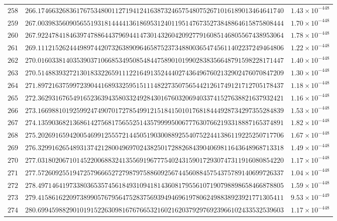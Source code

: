 \documentclass[12pt,reqno]{amsart}
\theoremstyle{remark}
\begin{document}
\begin{longtable}{clc}
$258$ & $266.1746632683617675348001127194124163873246575480752671016189013464641740$ & $1.43\times 10^{-448}$ \\
$259$ & $267.0039835609056551931814444136186953124011951476735273848864615875808444$ & $1.70\times 10^{-448}$ \\
$260$ & $267.9224784184639747886443796944147301432604209277916085146805567438953064$ & $1.78\times 10^{-448}$ \\
$261$ & $269.1112152624449897442073263890964658752373488003654745611402237249464806$ & $1.22\times 10^{-448}$ \\
$262$ & $270.0160338140353903710668534950854844758901019902838356648791598228171447$ & $1.40\times 10^{-448}$ \\
$263$ & $270.5148839327213018332265911122164913524440274364967602132902476070847209$ & $1.30\times 10^{-448}$ \\
$264$ & $271.8972163759972390441689332595151114822735075654421261749121712705178437$ & $1.18\times 10^{-448}$ \\
$265$ & $272.3629316765491652363943580332492843016760320694033741527638821637932421$ & $1.16\times 10^{-448}$ \\
$266$ & $273.1669881019259924749070172785499121518415010176818444928734297355284839$ & $1.53\times 10^{-448}$ \\
$267$ & $274.1359036821368614275681756552514357999950067776307662193318887165374891$ & $1.82\times 10^{-448}$ \\
$268$ & $275.2026916594200546991255572144505190300889255407522441386119225250717706$ & $1.67\times 10^{-448}$ \\
$269$ & $276.3299162654893137421280049697024382501728826843904069811643648968713318$ & $1.49\times 10^{-448}$ \\
$270$ & $277.0318020671014522006883241355691967775402431590172930747311916080854220$ & $1.17\times 10^{-448}$ \\
$271$ & $277.5726092551947257966652727987975886092567445608845754375789140699726337$ & $1.04\times 10^{-448}$ \\
$272$ & $278.4971464197338036535745618493109418143608179556107190798898658466878805$ & $1.59\times 10^{-448}$ \\
$273$ & $279.4158616220973899057679564752837569394946961978062498838923921771305411$ & $9.53\times 10^{-449}$ \\
$274$ & $280.6994598829010191522630981676766532160216203792976923966102433532539603$ & $1.17\times 10^{-448}$ \\

\end{longtable}
\end{document}
